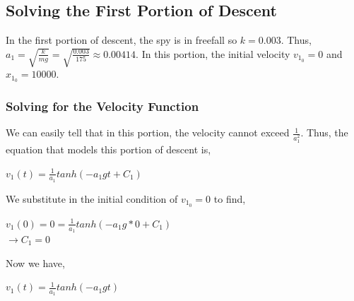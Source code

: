\documentclass{article}
\begin{document}
	\subsection{Solving the First Portion of Descent}
	In the first portion of descent, the spy is in freefall so $k = 0.003$. Thus, $a_1 = \sqrt{\frac{k}{mg}} = \sqrt{\frac{0.003}{175}} \approx 0.00414$. In this portion, the initial velocity $v_{1_0} = 0$ and $x_{1_0} = 10000$. 
	\subsubsection{Solving for the Velocity Function}
	We can easily tell that in this portion, the velocity cannot exceed $\frac{1}{a_1^2}$. Thus, the equation that models this portion of descent is,
	\begin{center}
		$v_1(t)=\frac{1}{a_1} tanh(-a_1gt+C_1)$
	\end{center}
	We substitute in the initial condition of $v_{1_0} =0$ to find,
	\begin{center}
	$v_1(0) = 0 =\frac{1}{a_1} tanh(-a_1g*0+C_1)$ \\
	$\rightarrow C_1 = 0$
	\end{center}
	Now we have, 
	\begin{center}
		$v_1(t)=\frac{1}{a_1} tanh(-a_1gt)$
	\end{center}
\end{document}
